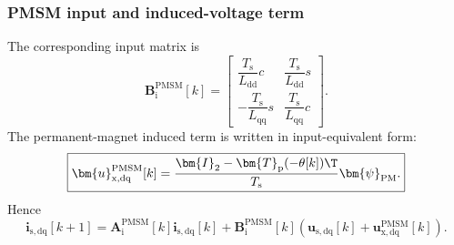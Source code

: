 \begin{frame}
	\frametitle{PMSM input and induced-voltage term}
	The corresponding input matrix is
	\begin{equation*}
		\bm{B}_{\mathrm{i}}^{\mathrm{PMSM}}[k]=
		\begin{bmatrix}
			\dfrac{T_{\mathrm{s}}}{L_{\mathrm{dd}}}c  & \dfrac{T_{\mathrm{s}}}{L_{\mathrm{dd}}}s \\[4mm]
			-\dfrac{T_{\mathrm{s}}}{L_{\mathrm{qq}}}s & \dfrac{T_{\mathrm{s}}}{L_{\mathrm{qq}}}c
		\end{bmatrix}.
	\end{equation*}\pause%
	The permanent-magnet induced term is written in input-equivalent form:
	\begin{equation*}
		\boxed{\bm{u}_{\mathrm{x},\mathrm{dq}}^{\mathrm{PMSM}}[k]
			=\frac{\bm{I}_2-\bm{T}_{\mathrm{p}}(-\theta[k])\T}{T_{\mathrm{s}}}\bm{\psi}_{\mathrm{PM}}.}
	\end{equation*}\pause%
	Hence
	\begin{equation*}
		\bm{i}_{\mathrm{s},\mathrm{dq}}[k+1]
		=\bm{A}_{\mathrm{i}}^{\mathrm{PMSM}}[k]\bm{i}_{\mathrm{s},\mathrm{dq}}[k]
		+\bm{B}_{\mathrm{i}}^{\mathrm{PMSM}}[k]
		\left(\bm{u}_{\mathrm{s},\mathrm{dq}}[k]
		+\bm{u}_{\mathrm{x},\mathrm{dq}}^{\mathrm{PMSM}}[k]\right).
	\end{equation*}
\end{frame}

